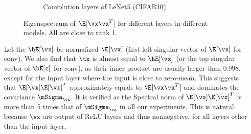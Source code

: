 \begin{figure}[th]
\begin{subfigure}[b]{0.32\textwidth}
        \caption{Convolution layers of LeNet5 (CIFAR10)}
        \label{fig:xxT_sig_lenet}
    \end{subfigure}
    \captionsetup{justification=centering}
    \caption{Eigenspectrum of $\E[\vx\vx^T]$ for different layers in different models. All are close to rank 1.}
    \label{fig:xxT}
\end{figure}

Let the $\hE[\vx]$ be normalized $\E[\vx]$ (first left singular vector of $\E[\vx]$ for conv). We also find that $\tx$ is almost equal to $\hE[\vx]$ (or the top singular vector of $\hE[x]$ for conv), as their inner product are usually larger than 0.998, except for the input layer where the input is close to zero-mean. This suggests that $\E[\vx]\E[\vx]^T$ approximately equals to $\E[\vx\vx^T]$ and dominates the covariance $\mSigma_\vx$. It is verified as the Spectral norm of $\E[\vx]\E[\vx]^T$ is more than 5 times that of $\mSigma_\vx$ in all our experiments. This is natural because $\vx$ are output of ReLU layers and thus nonnegative, for all layers other than the input layer.
